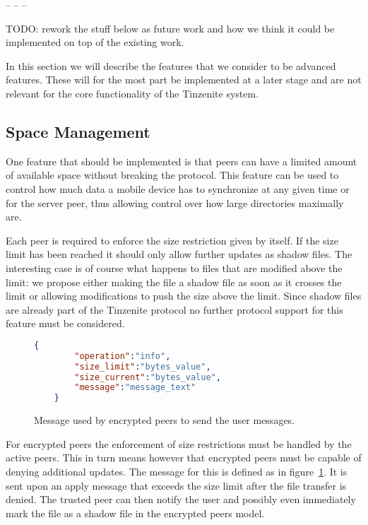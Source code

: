 -- -- --

TODO: rework the stuff below as future work and how we think it could be implemented on top of the existing work.

In this section we will describe the features that we consider to be advanced features.
These will for the most part be implemented at a later stage and are not relevant for the core functionality of the Tinzenite system.

\subsection{Space Management}
\label{sub:Space Management}

One feature that should be implemented is that peers can have a limited amount of available space without breaking the protocol.
This feature can be used to control how much data a mobile device has to synchronize at any given time or for the server peer, thus allowing control over how large directories maximally are.

Each peer is required to enforce the size restriction given by itself.
If the size limit has been reached it should only allow further updates as shadow files.
The interesting case is of course what happens to files that are modified above the limit: we propose either making the file a shadow file as soon as it crosses the limit or allowing modifications to push the size above the limit.
Since shadow files are already part of the Tinzenite protocol no further protocol support for this feature must be considered.

\begin{figure}[htp]
    \begin{lstlisting}[language=json,firstnumber=0]
    {
        "operation":"info",
        "size_limit":"bytes_value",
        "size_current":"bytes_value",
        "message":"message_text"
    }
    \end{lstlisting}
\caption[Information Message]{Message used by encrypted peers to send the user messages.}
\label{json:info_message}
\end{figure}

For encrypted peers the enforcement of size restrictions must be handled by the active peers.
This in turn means however that encrypted peers must be capable of denying additional updates.
The message for this is defined as in figure~\ref{json:info_message}.
It is sent upon an apply message that exceeds the size limit after the file transfer is denied.
The trusted peer can then notify the user and possibly even immediately mark the file as a shadow file in the encrypted peers model.

